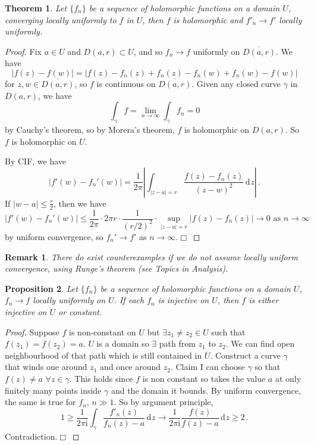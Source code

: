 \documentclass{article}
\theoremstyle{plain}\theoremheaderfont{\normalfont\itshape}\theorembodyfont{\rmfamily}\theoremseparator{.}\newtheorem*{rem}{Remark}\newtheorem*{ex}{Example}\newtheorem*{proof}{Proof}\newtheorem*{altp}{Alternative proof}\newtheorem*{con}{Consequences}\newtheorem*{notn}{Notations}\newtheorem*{cau}{Caution}\newtheorem*{term}{Terminology}\newtheorem*{keyex}{Key example}
\theoremstyle{plain}\theoremheaderfont{\normalfont\bfseries}\theorembodyfont{\rmfamily}\theoremseparator{.}\newtheorem{thm}{Theorem}[section]\newtheorem{lem}[thm]{Lemma}\newtheorem{prop}[thm]{Proposition}\newtheorem*{cor}{Corollary}\newtheorem{defn}[thm]{Definition}\newtheorem{clm}[thm]{Claim}\newtheorem{clminproof}{Claim}\newtheorem{leminproof}{Lemma}\newtheorem{app}{Application}
\theoremstyle{break}\theoremheaderfont{\normalfont\itshape}\theorembodyfont{\rmfamily}\theoremseparator{.\medskip}\newtheorem*{proofskip}{Proof}\newtheorem*{exs}{Examples}\newtheorem*{rems}{Remarks}\newtheorem*{rec}{Recall}\newtheorem*{ppts}{Properties}
\theoremstyle{break}\theoremheaderfont{\normalfont\bfseries}\theorembodyfont{\rmfamily}\theoremseparator{.\medskip}\newtheorem{lemskip}[thm]{Lemma}\newtheorem{defnskip}[thm]{Definition}\newtheorem{propskip}[thm]{Proposition}\newtheorem{thmskip}[thm]{Theorem}
\numberwithin{equation}{section}
\newcommand{\ii}{\mathrm{i}}
\newcommand{\qed}{\hfill\ensuremath{\Box}}
\newcommand{\abs}[1]{\left|#1\right|}
\newcommand{\dd}[2][]{\,\mathrm{d}^{#1} #2}
\begin{document}
    \begin{thm}
        Let \(\{f_n\}\) be a sequence of holomorphic functions on a domain \(U\), converging locally uniformly to \(f\) in \(U\), then \(f\) is holomorphic and \(f'_n\to f'\) locally uniformly.
    \end{thm}
    \begin{proof}
        Fix \(a\in U\) and \(D(a,r)\subset U\), and so \(f_n\to f\) uniformly on \(\overline{D(a,r)}\). We have
        \[\abs{f(z)-f(w)}=\abs{f(z)-f_n(z)+f_n(z)-f_n(w)+f_n(w)-f(w)}\]
        for \(z,w\in\overline{D(a,r)}\), so \(f\) is continuous on \(\overline{D(a,r)}\). Given any closed curve \(\gamma\) in \(D(a,r)\), we have
        \[\int_\gamma f=\lim_{n\to\infty}\int_\gamma f_n=0\]
        by Cauchy's theorem, so by Morera's theorem, \(f\) is holomorphic on \(D(a,r)\). So \(f\) is holomorphic on \(U\).

        By CIF, we have
        \[\abs{f'(w)-f_n'(w)}=\frac{1}{2\pi}\abs{\int_{\abs{z-a}=r}\frac{f(z)-f_n(z)}{(z-w)^2}\dd{z}}\,.\]
        If \(\abs{w-a}\le\frac{r}{2}\), then we have
        \[\abs{f'(w)-f_n'(w)}\le\frac{1}{2\pi}\cdot 2\pi r\cdot\frac{1}{(r/2)^2}\cdot\sup_{\abs{z-a}=r}\abs{f(z)-f_n(z)}\to 0\text{ as }n\to\infty\]
        by uniform convergence, so \(f_n'\to f'\) as \(n\to\infty\).\qed
    \end{proof}
    \begin{rem}
        There do exist counterexamples if we do not assume locally uniform convergence, using Runge's theorem (see Topics in Analysis). 
    \end{rem}
    \begin{prop}
        Let \(\{f_n\}\) be a sequence of holomorphic functions on a domain \(U\), \(f_n\to f\) locally uniformly on \(U\). If each \(f_n\) is injective on \(U\), then \(f\) is either injective on \(U\) or constant.
    \end{prop}
    \begin{proof}
        Suppose \(f\) is non-constant on \(U\) but \(\exists z_1\ne z_2\in U\) such that \(f(z_1)=f(z_2)=a\). \(U\) is a domain so \(\exists\) path from \(z_1\) to \(z_2\). We can find open neighbourhood of that path which is still contained in \(U\). Construct a curve \(\gamma\) that winds one around \(z_1\) and once around \(z_2\). Claim I can choose \(\gamma\) so that \(f(z)\ne a\) \(\forall z\in\gamma\). This holds since \(f\) is non constant so takes the value \(a\) at only finitely many points inside \(\gamma\) and the domain it bounds. By uniform convergence, the same is true for \(f_n\), \(n\gg 1\). So by argument principle,
        \[1\ge \frac{1}{2\pi \ii}\int_\gamma\frac{f'_n(z)}{f_n(z)-a}\dd{z}\to\frac{1}{2\pi \ii}\frac{f(z)}{f(z)-a}\dd{z}\ge 2\,.\]
        Contradiction.\qed
    \end{proof}
\end{document}
